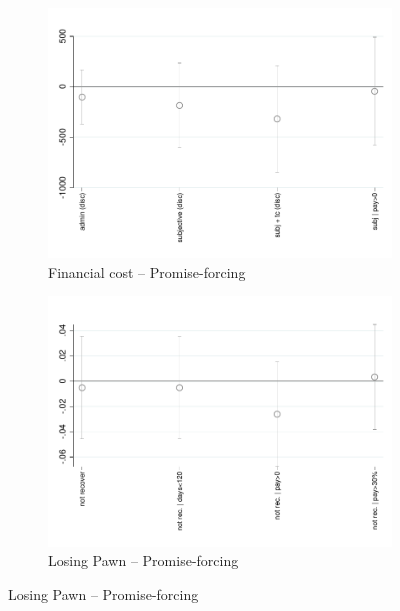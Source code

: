 \documentclass[11pt]{article}
\begin{document}
\begin{figure}[H]
    \caption{The effect of promises}
    \label{fc_pro5}
    \begin{center}
    
    \begin{subfigure}{0.45\textwidth}
        \caption{Financial cost -- Promise-forcing}
        \centering
        \includegraphics[width=\textwidth]{Figuras/fc_te_pro_3.pdf}
    \end{subfigure}
    \begin{subfigure}{0.45\textwidth}
        \caption{Losing Pawn -- Promise-forcing}
        \centering
        \includegraphics[width=\textwidth]{Figuras/def_te_pro_3.pdf}
    \end{subfigure}
    

\end{center}
\end{figure}
\end{document}
